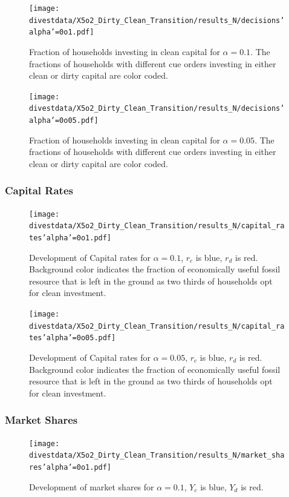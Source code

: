 \begin{figure}[H]
	\centering
	\texttt{[image: divestdata/X5o2\_Dirty\_Clean\_Transition/results\_N/decisions'alpha'=0o1.pdf]}
	\caption{Fraction of households investing in clean capital for $\alpha=0.1$. The fractions of households with different cue orders investing in either clean or dirty capital are color coded.}
	\label{5o2_1}
\end{figure}
\begin{figure}[H]
	\centering
	\texttt{[image: divestdata/X5o2\_Dirty\_Clean\_Transition/results\_N/decisions'alpha'=0o05.pdf]}
	\caption{Fraction of households investing in clean capital for $\alpha=0.05$. The fractions of households with different cue orders investing in either clean or dirty capital are color coded.}
	\label{5o2_2}
\end{figure}
\subsubsection{Capital Rates}
\begin{figure}[H]
	\centering
	\texttt{[image: divestdata/X5o2\_Dirty\_Clean\_Transition/results\_N/capital\_rates'alpha'=0o1.pdf]}
	\caption{Development of Capital rates for $\alpha=0.1$, $r_c$ is blue, $r_d$ is red. Background color indicates the fraction of economically useful fossil resource that is left in the ground as two thirds of households opt for clean investment.}

\end{figure}

\begin{figure}[H]
	\centering
	\texttt{[image: divestdata/X5o2\_Dirty\_Clean\_Transition/results\_N/capital\_rates'alpha'=0o05.pdf]}
	\caption{Development of Capital rates for $\alpha=0.05$, $r_c$ is blue, $r_d$ is red. Background color indicates the fraction of economically useful fossil resource that is left in the ground as two thirds of households opt for clean investment.}

\end{figure}
\subsubsection{Market Shares}
\begin{figure}[H]
	\centering
	\texttt{[image: divestdata/X5o2\_Dirty\_Clean\_Transition/results\_N/market\_shares'alpha'=0o1.pdf]}
	\caption{Development of market shares for $\alpha=0.1$, $Y_c$ is blue, $Y_d$ is red.}

\end{figure}

